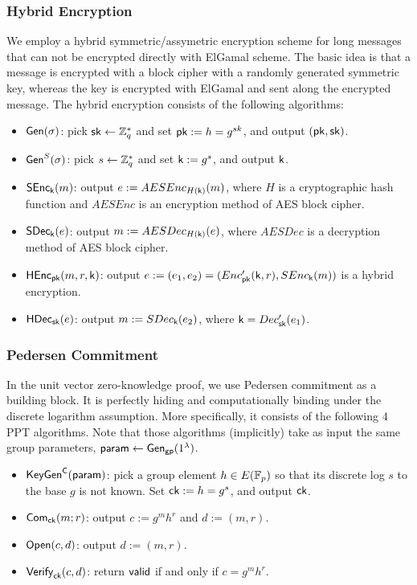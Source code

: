 \subsubsection{Hybrid Encryption}
We employ a hybrid symmetric/assymetric encryption scheme for long messages that can not be encrypted directly with ElGamal  scheme. The basic idea is that a message is encrypted with a block cipher with a randomly generated symmetric key, whereas the key is encrypted with ElGamal and sent along the encrypted message. The hybrid encryption consists of the following algorithms:
\begin{itemize}
	\item $\mathsf{Gen}(\sigma)$: pick $\mathsf{sk}\leftarrow \mathbb{Z}_q^*$ and set $\mathsf{pk}:=h=g^{sk}$, and output $(\mathsf{pk},\mathsf{sk})$. 
	\item $\mathsf{Gen}^S(\sigma)$: pick $s\leftarrow \mathbb{Z}_q^*$ and set $\mathsf{k}:=g^{s}$, and output $\mathsf{k}$. 
	\item $\mathsf{SEnc}_{\mathsf{k}}(m)$: output $e:=AESEnc_{H(\mathsf{k})}(m)$, where $H$ is a cryptographic hash function and $AESEnc$ is an encryption method of AES block cipher.
	\item $\mathsf{SDec}_{\mathsf{k}}(e)$: output $m:=AESDec_{H(\mathsf{k})}(e)$, where $AESDec$ is a decryption method of AES block cipher.
	\item $\mathsf{HEnc}_{\mathsf{pk}}(m,r,\mathsf{k})$: output $e:=(e_1,e_2)=(Enc'_{\mathsf{pk}}(\mathsf{k},r), SEnc_{\mathsf{k}}(m))$ is a hybrid encryption.
	\item $\mathsf{HDec}_{\mathsf{sk}}(e)$: output $m:=SDec_{\mathsf{k}}(e_2)$, where $\mathsf{k}=Dec'_{\mathsf{sk}}(e_1)$.
\end{itemize}

\subsubsection{Pedersen Commitment}
In the unit vector zero-knowledge proof, we use Pedersen commitment as a building block. It is perfectly hiding and computationally binding under the discrete logarithm assumption. 
More specifically, it consists of the following $4$ PPT algorithms. Note that those algorithms (implicitly) take as input the same group parameters, $\mathsf{param}\leftarrow \mathsf{Gen}_{\mathsf{gp}}(1^{\lambda})$. 

\begin{itemize}
\item $\mathsf{KeyGen}^{\mathsf{C}}(\mathsf{param})$: pick a group element $h\in E(\mathbb{F}_p)$ so that its discrete log $s$ to the base $g$ is not known. Set $\mathsf{ck}:=h=g^{s}$, and output $\mathsf{ck}$. 
\item $\mathsf{Com}_{\mathsf{ck}}(m;r)$: output $c:=g^m h^r$ and $d:=(m,r)$.
\item $\mathsf{Open}(c, d)$: output $d:=(m,r)$. 
\item $\mathsf{Verify}_{\mathsf{ck}}(c,d)$: return $\mathsf{valid}$ if and only if  $c = g^m h^r$.
\end{itemize}

